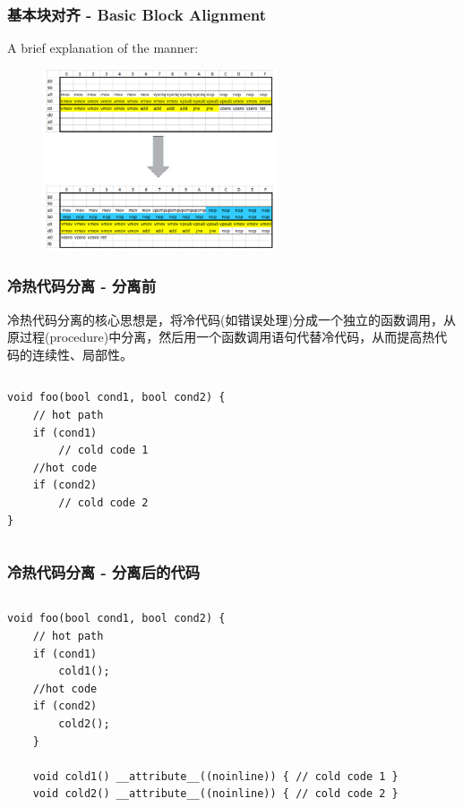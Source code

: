 \begin{frame}
\frametitle{基本块对齐 - Basic Block Alignment}
\centering

A brief explanation of the manner:

\begin{figure}
    \centering
    \includegraphics[width=0.618\textwidth]{images/alignment.png}
\end{figure}

\end{frame}
\begin{frame}[fragile]
    \frametitle{冷热代码分离 - 分离前}
    冷热代码分离的核心思想是，将冷代码(如错误处理)分成一个独立的函数调用，从原过程(procedure)中分离，然后用一个函数调用语句代替冷代码，从而提高热代码的连续性、局部性。
    \begin{columns}
        \begin{column}{0.7\textwidth}
            \begin{lstlisting}
void foo(bool cond1, bool cond2) {
    // hot path
    if (cond1)
        // cold code 1
    //hot code
    if (cond2)
        // cold code 2
}
            \end{lstlisting}
        \end{column}
    \end{columns}
\end{frame}


\begin{frame}[fragile]
    \frametitle{冷热代码分离 - 分离后的代码}
    \begin{columns}
        \begin{column}{1.0\textwidth}
            \begin{lstlisting}
void foo(bool cond1, bool cond2) {
    // hot path
    if (cond1)
        cold1(); 
    //hot code
    if (cond2)
        cold2(); 
    }
    
    void cold1() __attribute__((noinline)) { // cold code 1 }
    void cold2() __attribute__((noinline)) { // cold code 2 }
            \end{lstlisting}
        \end{column}
    \end{columns}
\end{frame}

